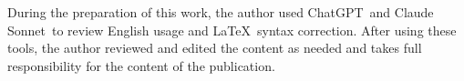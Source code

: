 During the preparation of this work, the author used ChatGPT\texttrademark ~and Claude Sonnet\texttrademark ~to review English usage and \LaTeX ~syntax correction. After using these tools, the author reviewed and edited the content as needed and takes full responsibility for the content of the publication.